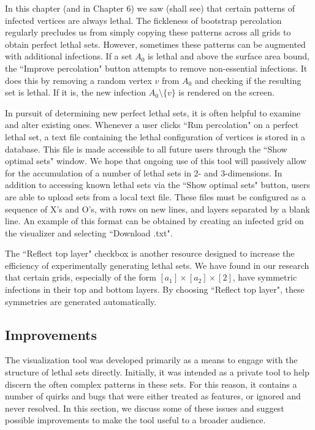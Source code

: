 In this chapter (and in Chapter 6) we saw (shall see) that certain patterns of infected vertices are always lethal. The fickleness of bootstrap percolation regularly precludes us from simply copying these patterns across all grids to obtain perfect lethal sets. However, sometimes these patterns can be augmented with additional infections. If a set $A_0$ is lethal and above the surface area bound, the ``Improve percolation" button attempts to remove non-essential infections. It does this by removing a random vertex $v$ from $A_0$ and checking if the resulting set is lethal. If it is, the new infection $A_0 \setminus \{v\}$ is rendered on the screen. 

In pursuit of determining new perfect lethal sets, it is often helpful to examine and alter existing ones. Whenever a user clicks ``Run percolation" on a perfect lethal set, a text file containing the lethal configuration of vertices is stored in a database. This file is made accessible to all future users through the ``Show optimal sets" window. We hope that ongoing use of this tool will passively allow for the accumulation of a number of lethal sets in 2- and 3-dimensions. In addition to accessing known lethal sets via the ``Show optimal sets" button, users are able to upload sets from a local text file. These files must be configured as a sequence of X's and O's, with rows on new lines, and layers separated by a blank line. An example of this format can be obtained by creating an infected grid on the visualizer and selecting ``Download .txt". 

The ``Reflect top layer" checkbox is another resource designed to increase the efficiency of experimentally generating lethal sets. We have found in our research that certain grids, especially of the form $[a_1] \times [a_2] \times [2]$, have symmetric infections in their top and bottom layers. By choosing ``Reflect top layer", these symmetries are generated automatically. 


\subsection{Improvements}

The visualization tool was developed primarily as a means to engage with the structure of lethal sets directly. Initially, it was intended as a private tool to help discern the often complex patterns in these sets. For this reason, it contains a number of quirks and bugs that were either treated as features, or ignored and never resolved. In this section, we discuss some of these issues and suggest possible improvements to make the tool useful to a broader audience. 

